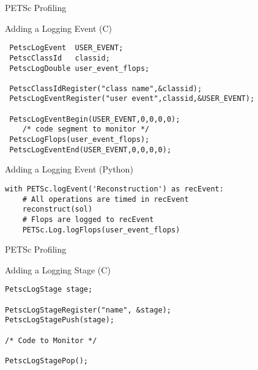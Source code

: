 

\begin{frame}[fragile]{PETSc Profiling}

  \begin{block}{Adding a Logging Event (C)}
   \begin{lstlisting}
 PetscLogEvent  USER_EVENT;
 PetscClassId   classid;
 PetscLogDouble user_event_flops;
 
 PetscClassIdRegister("class name",&classid);
 PetscLogEventRegister("user event",classid,&USER_EVENT);
 
 PetscLogEventBegin(USER_EVENT,0,0,0,0);
    /* code segment to monitor */
 PetscLogFlops(user_event_flops);
 PetscLogEventEnd(USER_EVENT,0,0,0,0);
\end{lstlisting}
  \end{block}

  \begin{block}{Adding a Logging Event (Python)}
   \begin{lstlisting}
with PETSc.logEvent('Reconstruction') as recEvent:
    # All operations are timed in recEvent
    reconstruct(sol)
    # Flops are logged to recEvent
    PETSc.Log.logFlops(user_event_flops)
\end{lstlisting}
  \end{block}

\end{frame}


\begin{frame}[fragile]{PETSc Profiling}

  \begin{block}{Adding a Logging Stage (C)}
   \begin{lstlisting}
PetscLogStage stage;

PetscLogStageRegister("name", &stage);
PetscLogStagePush(stage);

/* Code to Monitor */

PetscLogStagePop();
\end{lstlisting}
  \end{block}

\end{frame}


